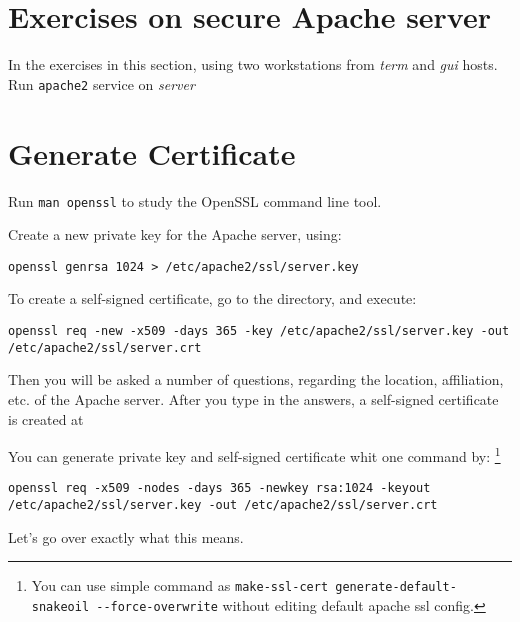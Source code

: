 \documentclass{../UTNetLab}
\begin{document}
\section*{Exercises on secure Apache server}
	In the exercises in this section, using two workstations from \textit{term} and \textit{gui} hosts. Run \lstinline{apache2} service on \textit{server}

\section{Generate Certificate}
	Run \lstinline{man openssl} to study the OpenSSL command line tool.

	Create a new private key for the Apache server, using:
	\begin{lstlisting}
openssl genrsa 1024 > /etc/apache2/ssl/server.key
	\end{lstlisting}
	To create a self-signed certificate, go to the  directory, and execute:
	\begin{lstlisting}
openssl req -new -x509 -days 365 -key /etc/apache2/ssl/server.key -out /etc/apache2/ssl/server.crt
	\end{lstlisting}
	Then you will be asked a number of questions, regarding the location, affiliation, etc. of the Apache server. After you type in the answers, a self-signed certificate is created at 

	You can generate private key and self-signed certificate whit one command by:
	\footnote{You can use simple command as \lstinline{make-ssl-cert generate-default-snakeoil --force-overwrite} without editing default apache ssl config.}
	\begin{lstlisting}
openssl req -x509 -nodes -days 365 -newkey rsa:1024 -keyout /etc/apache2/ssl/server.key -out /etc/apache2/ssl/server.crt
	\end{lstlisting}

		Let's go over exactly what this means.
\end{document}
